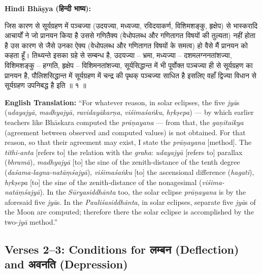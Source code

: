\documentclass[11pt,a4paper]{article}
\newcommand{\dev}[1]{{\devanagarifont #1}}
\newenvironment{sanskritverse}{%
  \begin{center}\begin{minipage}{0.95\textwidth}
  \setlength{\leftskip}{1em}
  \setlength{\rightskip}{1em}
  \dev
}{\end{minipage}\end{center}}
\newenvironment{paracol}[1]{\begingroup}{\endgroup}
\newcommand{\switchcolumn}[1][]{%
  \ifnum#1=0\relax\else\par\nobreak\vspace{0.5em}\par\nobreak\fi%
}
\begin{document}
\begin{paracol}{2}

\noindent\textbf{Hindi Bhāṣya (\dev{हिन्दी भाष्य}):}
\begin{sanskritverse}
जिस कारण से सूर्यग्रहण में पञ्चज्या (उदयज्या, मध्यज्या, रविदयाकर्ण, विशिमशङ्कु,
हृक्षेप) से भास्करादि आचार्यों ने जो प्रानयन किया है उससे गणितैक्य (वेधोपलब्ध और
गणितागत विषयों की तुल्यता) नहीं होता है उस कारण से जैसे उनका ऐक्य (वेधोपलब्ध और
गणितागत विषयों के समत्व) हो वैसे मैं प्रानयन को कहता हूँ। तिथ्यन्ते इसका ग्रहे से
सम्बन्ध है, उदयज्या -- भ्रमा, मध्यज्या -- दशमलग्ननतांशज्या, विशिमशङ्कु -- हग्गति,
हृक्षेप -- विशिमनतांशज्या, सूर्यसिद्धान्त में भी पूर्वोक्त पञ्चज्या ही से सूर्यग्रहण का
प्रानयन है, पौलिशसिद्धान्त में सूर्यग्रहण में चन्द्र की पृथक् पञ्चज्या साधित है इसलिए
वहाँ द्विज्या विधान से सूर्यग्रहण उपनिबद्ध है इति ॥ १ ॥
\end{sanskritverse}

\switchcolumn

\textbf{English Translation:} ``For whatever reason, in solar eclipses, the five \textit{jyā}s (\textit{udayajyā}, \textit{madhyajyā}, \textit{ravidayākarṇa}, \textit{viśimaśaṅku}, \textit{hṛkṣepa}) --- by which earlier teachers like Bhāskara computed the \textit{prāṇayana} --- from that, the \textit{gaṇitaikya} (agreement between observed and computed values) is not obtained. For that reason, so that their agreement may exist, I state the \textit{prāṇayana} [method]. The \textit{tithi-anta} [refers to] the relation with the \textit{graha}: \textit{udayajyā} [refers to] parallax (\textit{bhramā}), \textit{madhyajyā} [to] the sine of the zenith-distance of the tenth degree (\textit{daśama-lagna-natāṃśajyā}), \textit{viśimaśaṅku} [to] the ascensional difference (\textit{hagati}), \textit{hṛkṣepa} [to] the sine of the zenith-distance of the nonagesimal (\textit{viśima-natāṃśajyā}). In the \textit{Sūryasiddhānta} too, the solar eclipse \textit{prāṇayana} is by the aforesaid five \textit{jyā}s. In the \textit{Pauliśasiddhānta}, in solar eclipses, separate five \textit{jyā}s of the Moon are computed; therefore there the solar eclipse is accomplished by the two-\textit{jyā} method.''

\end{paracol}

\subsection{Verses 2--3: Conditions for \texorpdfstring{{\devanagarifont लम्बन}}{lambana} (Deflection) and \texorpdfstring{{\devanagarifont अवनति}}{avanati} (Depression)}
\end{document}
